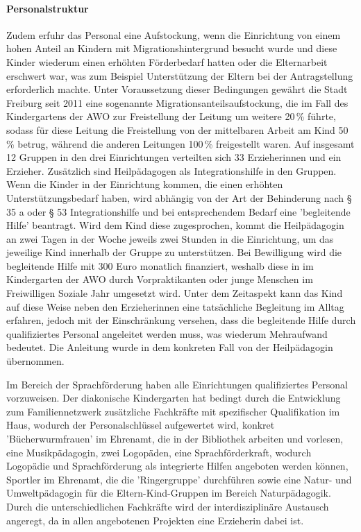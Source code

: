 \paragraph{Personalstruktur}
Zudem erfuhr das Personal eine Aufstockung, wenn die Einrichtung von einem hohen Anteil an Kindern mit Migrationshintergrund besucht wurde und diese Kinder wiederum einen erhöhten Förderbedarf hatten oder die Elternarbeit erschwert war, was zum Beispiel Unterstützung der Eltern bei der Antragstellung erforderlich machte. Unter Voraussetzung dieser Bedingungen gewährt die Stadt Freiburg seit 2011 eine sogenannte Migrationsanteilsaufstockung, die im Fall des Kindergartens der AWO zur Freistellung der Leitung um weitere 20\,\% führte, sodass für diese Leitung die Freistellung von der mittelbaren Arbeit am Kind 50\,\% betrug, während die anderen Leitungen 100\,\% freigestellt waren. 
Auf insgesamt 12 Gruppen in den drei Einrichtungen verteilten sich 33 Erzieherinnen und ein Erzieher. Zusätzlich sind Heilpädagogen als Integrationshilfe in den Gruppen. Wenn die Kinder in der Einrichtung kommen, die einen erhöhten Unterstützungsbedarf haben, wird abhängig von der Art der Behinderung nach § 35 a oder § 53 Integrationshilfe und bei entsprechendem Bedarf eine 'begleitende Hilfe' beantragt. Wird dem Kind diese zugesprochen, kommt die Heilpädagogin an zwei Tagen in der Woche jeweils zwei Stunden in die Einrichtung, um das jeweilige Kind innerhalb der Gruppe zu unterstützen. Bei Bewilligung wird die begleitende Hilfe mit 300 Euro monatlich finanziert, weshalb diese in im Kindergarten der AWO durch Vorpraktikanten oder junge Menschen im Freiwilligen Soziale Jahr umgesetzt wird. Unter dem Zeitaspekt kann das Kind auf diese Weise neben den Erzieherinnen eine tatsächliche Begleitung im Alltag erfahren, jedoch mit der Einschränkung versehen, dass die begleitende Hilfe durch qualifiziertes Personal angeleitet werden muss, was wiederum Mehraufwand bedeutet. Die Anleitung wurde in dem konkreten Fall von der Heilpädagogin übernommen. 

Im Bereich der Sprachförderung haben alle Einrichtungen qualifiziertes Personal vorzuweisen. Der diakonische Kindergarten hat bedingt durch die Entwicklung zum Familiennetzwerk zusätzliche Fachkräfte mit spezifischer Qualifikation im Haus, wodurch der Personalschlüssel aufgewertet wird, konkret 'Bücherwurmfrauen' im Ehrenamt, die in der Bibliothek arbeiten und vorlesen, eine Musikpädagogin, zwei Logopäden, eine Sprachförderkraft, wodurch Logopädie und Sprachförderung als integrierte Hilfen angeboten werden können, Sportler im Ehrenamt, die die 'Ringergruppe' durchführen sowie eine Natur- und Umweltpädagogin für die Eltern-Kind-Gruppen im Bereich Naturpädagogik. Durch die unterschiedlichen Fachkräfte wird der interdisziplinäre Austausch angeregt, da in allen angebotenen Projekten eine Erzieherin dabei ist.  

